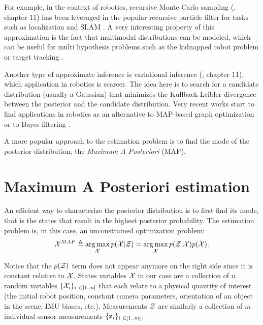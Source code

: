 For example, in the context of robotics, recursive Monte Carlo sampling (\cite{koller2009probabilistic}, chapter 11) has been 
leveraged in the popular recursive particle filter for tasks such as localization \cite{dellaert1999monte} and SLAM \cite{montemerlo2002fastslam}. A very interesting
property of this approximation is the fact that multimodal distributions can be modeled, which can be useful
for multi hypothesis problems such as the kidnapped robot problem \cite{dellaert1999monte} or target tracking \cite{gustafsson2002particle}. 

Another type of approximate inference is variational inference (\cite{koller2009probabilistic}, chapter 11), which application in robotics is scarcer. The idea here is to search for a candidate distribution 
(usually a Gaussian) that minimizes the Kullback-Leibler divergence between the posterior and the candidate distribution. Very recent works start 
to find applications in robotics as an alternative to MAP-based graph optimization \cite{barfoot2020exactly, wong2020variational} 
or to Bayes filtering \cite{lambert2022recursive}. 

A more popular approach to the estimation problem is to find the mode of the posterior distribution, \aka the \textit{Maximum A Posteriori} (MAP).




\section{Maximum A Posteriori estimation}
\label{sec:MAP}

An efficient way to characterize the posterior distribution is to first find its mode, that is the states that 
result in the highest posterior probability. The estimation problem is, in this case, an unconstrained optimization problem:
%
\begin{equation}
    \label{eq:MAP_pbe}
    \mathcal{X}^{MAP} \triangleq \operatorname*{arg\,max}_{\mathcal{X}} p(\mathcal{X} | \mathcal{Z}) = \operatorname*{arg\,max}_{\mathcal{X}} p(\mathcal{Z} | \mathcal{X}) p(\mathcal{X}).
\end{equation}

Notice that the $p(\mathcal{Z})$ term does not appear anymore on the right side since it is constant relative to $\mathcal{X}$.
States variables $\mathcal{X}$ in our case are a collection of $n$ random variables $\{\cX_i\}_{i \in [1..n]}$ that each relate to a physical quantity of 
interest (\eg the initial robot position, constant camera parameters, orientation of an object in the scene, IMU biases, etc.). Measurements $\mathcal{Z}$ are 
similarly a collection of $m$ individual sensor measurements $\{\bfz_i\}_{i \in [1..m]}$.

